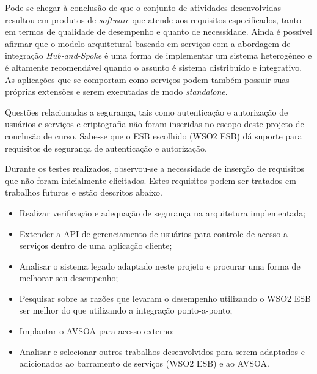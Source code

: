 Pode-se chegar à conclusão de que o conjunto de atividades desenvolvidas resultou em produtos de \textit{software} que atende aos requisitos especificados, tanto em termos de qualidade de desempenho e quanto de necessidade. Ainda é possível afirmar que o modelo arquitetural baseado em serviços com a abordagem de integração \textit{Hub-and-Spoke} é uma forma de implementar um sistema heterogêneo e é altamente recomendável quando o assunto é sistema distribuído e integrativo. As aplicações que se comportam como serviços podem também possuir suas próprias extensões e serem executadas de modo \textit{standalone}.

Questões relacionadas a segurança, tais como autenticação e autorização de usuários e serviços e criptografia não foram inseridas no escopo deste projeto de conclusão de curso. Sabe-se que o ESB escolhido (WSO2 ESB) dá suporte para requisitos de segurança de autenticação e autorização. 

Durante os testes realizados, observou-se a necessidade de inserção de requisitos que não foram inicialmente elicitados. Estes requisitos podem ser tratados em trabalhos futuros e estão descritos abaixo.

\begin{itemize}
\item Realizar verificação e adequação de segurança na arquitetura implementada;
\item Extender a API de gerenciamento de usuários para controle de acesso a serviços dentro de uma aplicação cliente;
\item Analisar o sistema legado adaptado neste projeto e procurar uma forma de melhorar seu desempenho;
\item Pesquisar sobre as razões que levaram o desempenho utilizando o WSO2 ESB ser melhor do que utilizando a integração ponto-a-ponto;
\item Implantar o AVSOA para acesso externo;
\item Analisar e selecionar outros trabalhos desenvolvidos para serem adaptados e adicionados ao barramento de serviços (WSO2 ESB) e ao AVSOA.
\end{itemize}


